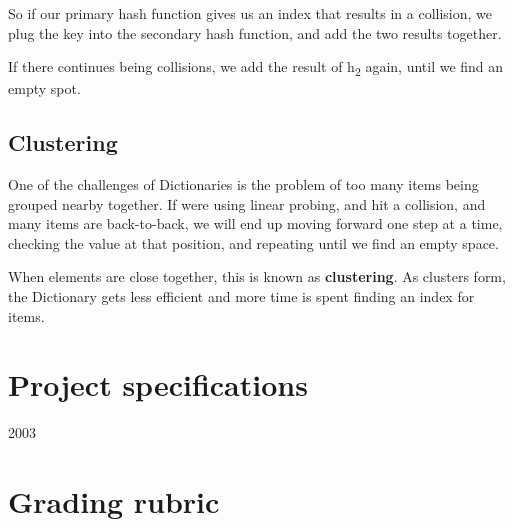So if our primary hash function gives us an index that results in a collision, we plug the key into the secondary hash function, and add the two results together.

If there continues being collisions, we add the result of h\textsubscript{2} again, until we find an empty spot.

\subsection*{Clustering}

One of the challenges of Dictionaries is the problem of too many items being grouped nearby together. If we\textquotesingle{}re using linear probing, and hit a collision, and many items are back-\/to-\/back, we will end up moving forward one step at a time, checking the value at that position, and repeating until we find an empty space.

When elements are close together, this is known as {\bfseries clustering}. As clusters form, the Dictionary gets less efficient and more time is spent finding an index for items. 



\section*{Project specifications}

2003 



\section*{Grading rubric}
